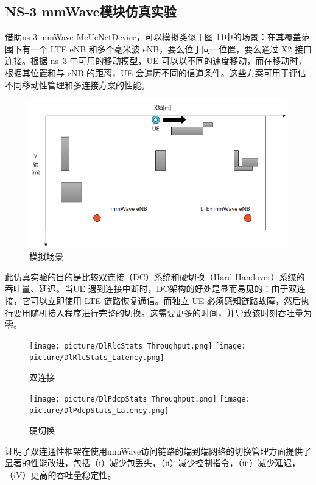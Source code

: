 \documentclass{article}
\begin{document}
\subsection{NS-3 mmWave模块仿真实验}
借助ns-3 mmWave McUeNetDevice，可以模拟类似于图 11中的场景：在其覆盖范围下有一个 LTE eNB 和多个毫米波 eNB，要么位于同一位置，要么通过 X2 接口连接。根据 ns–3 中可用的移动模型，UE 可以以不同的速度移动，而在移动时，根据其位置和与 eNB 的距离，UE 会遍历不同的信道条件。这些方案可用于评估不同移动性管理和多连接方案的性能。
\begin{figure}[ht]
	\centering
	\includegraphics[scale=0.6]{picture/buildings.png}
	\caption{模拟场景}
	\label{fig:delay2}
\end{figure}

此仿真实验的目的是比较双连接（DC）系统和硬切换（Hard Handover）系统的吞吐量、延迟。当UE 遇到连接中断时，DC架构的好处是显而易见的：由于双连接，它可以立即使用 LTE 链路恢复通信。而独立 UE 必须感知链路故障，然后执行要用随机接入程序进行完整的切换。这需要更多的时间，并导致该时刻吞吐量为零。
\begin{figure}[H]
	\centering
	\texttt{[image: picture/DlRlcStats\_Throughput.png]}
	\texttt{[image: picture/DlRlcStats\_Latency.png]}
	\caption{双连接}
	\label{fig:delay3}
\end{figure}
\begin{figure}[H]
	\centering
	\texttt{[image: picture/DlPdcpStats\_Throughput.png]}
	\texttt{[image: picture/DlPdcpStats\_Latency.png]}
	\caption{硬切换}
	\label{fig:delay4}
\end{figure}

证明了双连通性框架在使用mmWave访问链路的端到端网络的切换管理方面提供了显著的性能改进，包括（i）减少包丢失，（ii）减少控制指令，（iii）减少延迟，（iV）更高的吞吐量稳定性。
\end{document}
